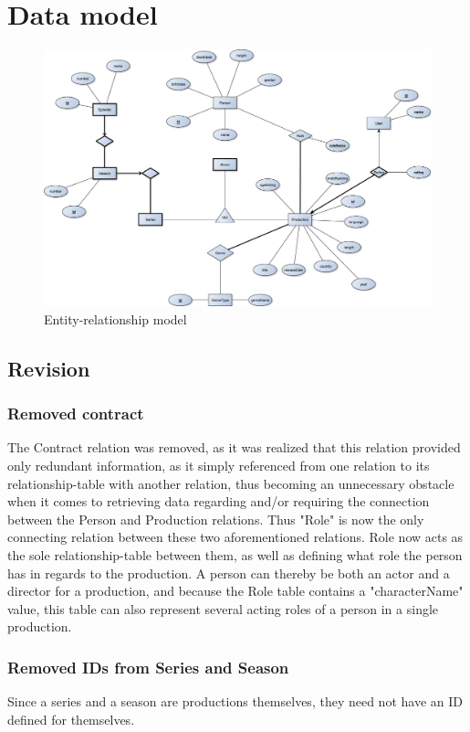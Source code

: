 \section{Data model}
\FloatBarrier
\begin{figure}[ht]
	\centering
	\centerline{\includegraphics[scale=0.35]{figures/ERD.pdf}}
	\caption{Entity-relationship model}
\end{figure}
\FloatBarrier

\subsection{Revision}
\subsubsection{Removed contract}
The Contract relation was removed, as it was realized that this relation provided only redundant information, as it simply referenced from one relation to its relationship-table with another relation, thus becoming an unnecessary obstacle when it comes to retrieving data regarding and/or requiring the connection between the Person and Production relations. Thus "Role" is now the only connecting relation between these two aforementioned relations. Role now acts as the sole relationship-table between them, as well as defining what role the person has in regards to the production. A person can thereby be both an actor and a director for a production, and because the Role table contains a "characterName" value, this table can also represent several acting roles of a person in a single production.

\subsubsection{Removed IDs from Series and Season}
Since a series and a season are productions themselves, they need not have an ID defined for themselves.

